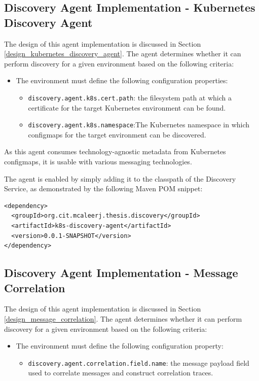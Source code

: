 \subsection{Discovery Agent Implementation - Kubernetes Discovery Agent} 

The design of this agent implementation is discussed in Section \ref{design_kubernetes_discovery_agent}. The agent determines whether it can perform discovery for a given environment based on the following criteria:

\begin{itemize}
	\item The environment must define the following configuration properties:
	\begin{itemize}
	\item \texttt{discovery.agent.k8s.cert.path}: the filesystem path at which a certificate for the target Kubernetes environment can be found.
	\item \texttt{discovery.agent.k8s.namespace}:The Kubernetes namespace in which configmaps for the target environment can be discovered.
	\end{itemize}
\end{itemize}

As this agent consumes technology-agnostic metadata from Kubernetes configmaps, it is usable with various messaging technologies.

The agent is enabled by simply adding it to the classpath of the Discovery Service, as demonstrated by the following Maven POM snippet:

\begin{lstlisting}
<dependency>
  <groupId>org.cit.mcaleerj.thesis.discovery</groupId>
  <artifactId>k8s-discovery-agent</artifactId>
  <version>0.0.1-SNAPSHOT</version>
</dependency>
\end{lstlisting}

\subsection{Discovery Agent Implementation - Message Correlation}\label{discovery_service_correlation_agent} 

The design of this agent implementation is discussed in Section \ref{design_message_correlation}. The agent determines whether it can perform discovery for a given environment based on the following criteria:

\begin{itemize}
	\item The environment must define the following configuration property:
	\begin{itemize}
		\item \texttt{discovery.agent.correlation.field.name}: the message payload field used to correlate messages and construct correlation traces.
	\end{itemize}
\end{itemize}

